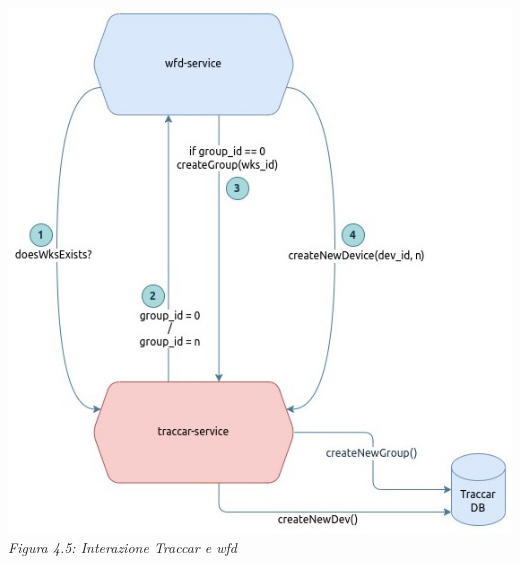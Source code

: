 \documentclass[a4paper,titlepage,12pt]{report}
\begin{document}
{\begin{center}
\includegraphics[scale=0.5]{images/wfd_traccar.jpg}\\ 
\textit{Figura 4.5: Interazione Traccar e wfd}
\end{center}


}
\end{document}
